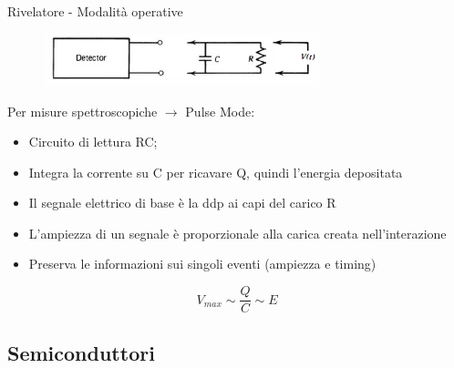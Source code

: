 \documentclass{beamer}
\begin{document}
\begin{frame}{Rivelatore - Modalità operative}
    \begin{figure}
        \centering
        \includegraphics[width=8cm]{images/pulse_mode.png}
    \end{figure}
    Per misure spettroscopiche $\to$ Pulse Mode:
    \begin{itemize}
        \item Circuito di lettura RC;
        \item Integra la corrente su C per ricavare Q, quindi l'energia depositata
        \item Il segnale elettrico di base è la ddp ai capi del carico R
        \item L'ampiezza di un segnale è proporzionale alla carica creata nell'interazione
        \item Preserva le informazioni sui singoli eventi (ampiezza e timing)
    \end{itemize}
    \begin{equation*}
        V_{max} \sim \frac{Q}{C} \sim E
    \end{equation*}
\end{frame}

\subsection{Semiconduttori}
\end{document}
